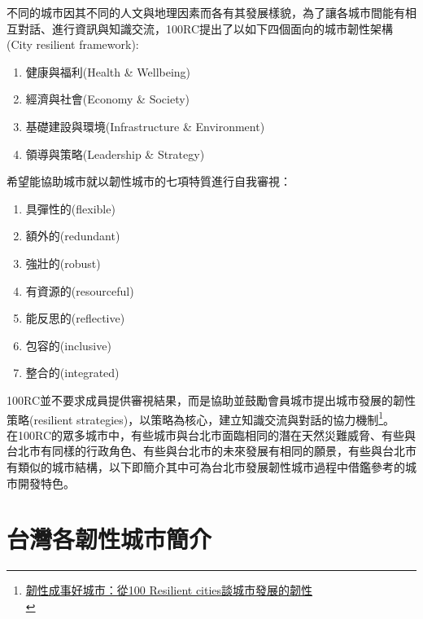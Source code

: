 \documentclass[a4paper,12pt]{article}
\begin{document}
不同的城市因其不同的人文與地理因素而各有其發展樣貌，為了讓各城市間能有相互對話、進行資訊與知識交流，100RC提出了以如下四個面向的城市韌性架構(City resilient framework):\\
\begin{enumerate}
\item 健康與福利(Health \& Wellbeing)\\
\item 經濟與社會(Economy \& Society)\\
\item 基礎建設與環境(Infrastructure \& Environment)\\
\item 領導與策略(Leadership \& Strategy)\\
\end{enumerate}
希望能協助城市就以韌性城市的七項特質進行自我審視：\\
\begin{enumerate}
\item 具彈性的(flexible)\\
\item 額外的(redundant)\\
\item 強壯的(robust)\\
\item 有資源的(resourceful)\\
\item 能反思的(reflective)\\
\item 包容的(inclusive)\\
\item 整合的(integrated)\\
\end{enumerate}
100RC並不要求成員提供審視結果，而是協助並鼓勵會員城市提出城市發展的韌性策略(resilient strategies)，以策略為核心，建立知識交流與對話的協力機制\footnote{\href{https://eyesonplace.net/2018/12/10/9521/}{韌性成事好城市：從100 Resilient cities談城市發展的韌性}\\\label{orgbb0d484}}。\\

在100RC的眾多城市中，有些城市與台北市面臨相同的潛在天然災難威脅、有些與台北市有同樣的行政角色、有些與台北市的未來發展有相同的願景，有些與台北市有類似的城市結構，以下即簡介其中可為台北市發展韌性城市過程中借鑑參考的城市開發特色。\\
\newpage

\section{台灣各韌性城市簡介}
\label{sec:orge00d451}
\end{document}
